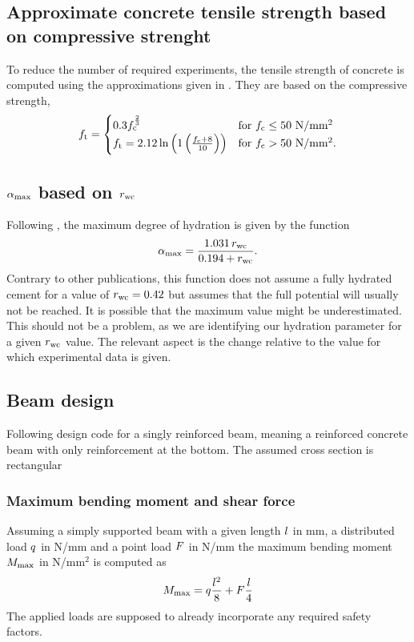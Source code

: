 \subsection{Approximate concrete tensile strength based on compressive strenght}
To reduce the number of required experiments, the tensile strength of concrete is computed using the approximations given in \citeauthor{DIN1992-1-1}.
They are based on the compressive strength, 
\begin{align}
f_{\text{t}} = 
\begin{cases}
0.3 f_{\text{c}}^{\frac{2}{3}}  & \text{for $f_{\text{c}} \le 50$ N/mm$^2$}\\
f_{\text{t}} =2.12 \ln \left( 1 \left( \frac{f_{\text{c}} + 8}{10}\right) \right)& \text{for $f_{\text{c}} > 50$ N/mm$^2$}  \label{eq:tensilstrength}.
\end{cases}
\end{align}
\subsection{\texorpdfstring{$\alpha_{\text{max}}$}{Maxiumum DoH} based on \texorpdfstring{$r_{\text{wc}}$}{w/c}}
Following \cite{Mills1966fico}, the maximum degree of hydration is given by the function
\begin{align}
	\alpha_{\text{max}} = \dfrac{1.031\,r_{\text{wc}}}{0.194 + r_{\text{wc}}}.
\end{align}
Contrary to other publications, this function does not assume a fully hydrated cement for a value of $r_{\text{wc}} = 0.42$ but assumes that the full potential will usually not be reached.
It is possible that the maximum value might be underestimated.
This should not be a problem, as we are identifying our hydration parameter for a given $r_{\text{wc}}$ value.
The relevant aspect is the change relative to the value for which experimental data is given.
\subsection{Beam design}
Following design code \citeauthor{DIN1992-1-1} for a singly reinforced beam, meaning a reinforced concrete beam with only reinforcement at the bottom.
The assumed cross section is rectangular

\subsubsection{Maximum bending moment and shear force}
Assuming a simply supported beam with a given length $l$ in mm, a distributed load $q$ in N/mm and a point load $F$ in N/mm
the maximum bending moment $M_{\text{max}}$ in N/mm$^2$ is computed as
\begin{align}
	M_{\text{max}}= q \frac{l^2}{8} + F \frac{l}{4}
\end{align}
The applied loads are supposed to already incorporate any required safety factors.
